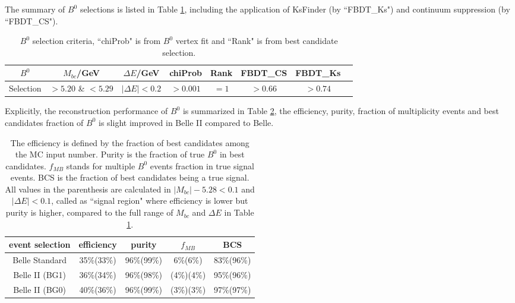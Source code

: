 The summary of $B^0$ selections is listed in Table \ref{tab:b0select}, including the application of KsFinder (by ``FBDT\_Ks") and continuum suppression (by ``FBDT\_CS").
\begin{table}[H]
	\centering 
	\begin{tabular}{|c|c|c|c|c|c|c|c|} 
		\hline
		$B^0$  & $M_{bc}$/GeV& $\Delta E$/GeV & chiProb & Rank & FBDT\_CS & FBDT\_Ks\\
		\hline
		Selection & $> 5.20$ \& $< 5.29$  &  $ |\Delta E|< 0.2$ & $> 0.001$  & $=1$ & $>0.66$ & $>0.74$\\
		\hline
	\end{tabular}
	\caption{$B^0$ selection criteria, ``chiProb" is from $B^0$ vertex fit and ``Rank" is from best candidate selection.}
	\label{tab:b0select}
\end{table}

Explicitly, the reconstruction performance of $B^0$ is summarized in Table \ref{tab:b0stats}, the efficiency, purity, fraction of multiplicity events and best candidates fraction of $B^0$ is slight improved in Belle II compared to Belle.
\begin{table}[H]
	\centering
	\begin{tabular}{c|c|c|c|c}
		\hline
		event selection & efficiency & purity  & $f_{MB}$  & BCS \\
		\hline
		\hline
		Belle Standard & 35\%(33\%) & 96\%(99\%) & 6\%(6\%) & 83\%(96\%)\\
		\hline 
		Belle II (BG1) & 36\%(34\%) & 96\%(98\%) & (4\%)(4\%) & 95\%(96\%)\\
		\hline
		Belle II (BG0) & 40\%(36\%) & 96\%(99\%) & (3\%)(3\%) & 97\%(97\%)\\
		\hline
	\end{tabular}
	\caption{The efficiency is defined by the fraction of best candidates among the MC input number. Purity is the fraction of true $B^0$ in best candidates. $f_{MB}$ stands for multiple $B^0$ events fraction in true signal events. BCS is the fraction of best candidates being a true signal. All values in the parenthesis are calculated in $| M_{bc} |- 5.28 < 0.1$ and $|\Delta E| < 0.1$, called as ``signal region" where efficiency is lower but purity is higher, compared to the full range of $M_{bc}$ and $\Delta E$ in Table \ref{tab:b0select}. }
	\label{tab:b0stats}
\end{table}


